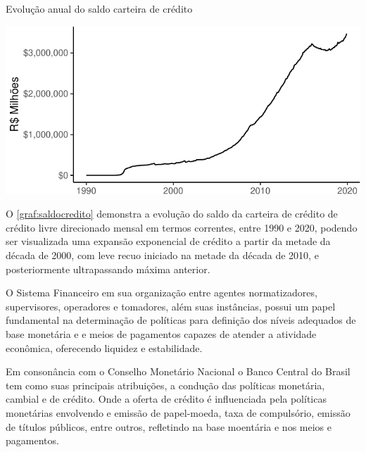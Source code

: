 \documentclass[
  12pt,
  12pt,
  openright,
  oneside,
  a4paper,
  chapter=TITLE,
  section=TITLE,
  subsection=TITLE,
  subsubsection=TITLE,
  english,
  portugues,
  sumario=tradicional]{abntex2}
\begin{document}
\begin{grafico}[!ht]
\vspace{20pt}
\caption{Evolução anual do saldo carteira de crédito}
\vspace{-4mm}

\begin{center}\includegraphics{12-exportedfigures/balance.credit-1} \end{center}
\vspace{-3mm}
\label{graf:saldocredito}
\vspace{-2mm}
\end{grafico}

O \autoref{graf:saldocredito} demonstra a evolução do saldo da carteira de crédito de crédito livre direcionado mensal em termos correntes, entre 1990 e 2020, podendo ser visualizada uma expansão exponencial de crédito a partir da metade da década de 2000, com leve recuo iniciado na metade da década de 2010, e posteriormente ultrapassando máxima anterior.

O Sistema Financeiro em sua organização entre agentes normatizadores, supervisores, operadores e tomadores, além suas instâncias, possui um papel fundamental na determinação de políticas para definição dos níveis adequados de base monetária e e meios de pagamentos capazes de atender a atividade econômica, oferecendo liquidez e estabilidade.

Em consonância com o Conselho Monetário Nacional o Banco Central do Brasil tem como suas principais atribuições, a condução das políticas monetária, cambial e de crédito. Onde a oferta de crédito é influenciada pela políticas monetárias envolvendo e emissão de papel-moeda, taxa de compulsório, emissão de títulos públicos, entre outros, refletindo na base moentária e nos meios e pagamentos.
\end{document}
